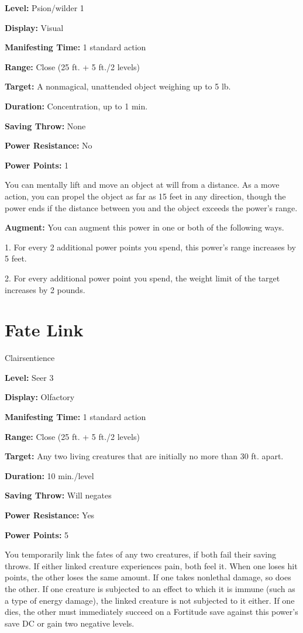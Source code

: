 \documentclass{article}
\begin{document}
\textbf{Level:} Psion/wilder 1

\textbf{Display:} Visual

\textbf{Manifesting Time:} 1 standard action

\textbf{Range:} Close (25 ft. + 5 ft./2 levels)

\textbf{Target:} A nonmagical, unattended object weighing up to 5 lb.

\textbf{Duration:} Concentration, up to 1 min.

\textbf{Saving Throw:} None

\textbf{Power Resistance:} No

\textbf{Power Points:} 1

You can mentally lift and move an object at will from a distance. As a move action, 
you can propel the object as far as 15 feet in any direction, though the power 
ends if the distance between you and the object exceeds the power's range.

\textbf{Augment:} You can augment this power in one or both of the following ways.

1. For every 2 additional power points you spend, this power's range increases 
by 5 feet.

2. For every additional power point you spend, the weight limit of the target increases 
by 2 pounds.

\vspace{12pt}
\section*{Fate Link}

Clairsentience

\textbf{Level:} Seer 3

\textbf{Display:} Olfactory

\textbf{Manifesting Time:} 1 standard action

\textbf{Range:} Close (25 ft. + 5 ft./2 levels)

\textbf{Target:} Any two living creatures that are initially no more than 30 ft. 
apart.

\textbf{Duration:} 10 min./level

\textbf{Saving Throw:} Will negates

\textbf{Power Resistance:} Yes

\textbf{Power Points:} 5

You temporarily link the fates of any two creatures, if both fail their saving 
throws. If either linked creature experiences pain, both feel it. When one loses 
hit points, the other loses the same amount. If one takes nonlethal damage, so 
does the other. If one creature is subjected to an effect to which it is immune 
(such as a type of energy damage), the linked creature is not subjected to it either. 
If one dies, the other must immediately succeed on a Fortitude save against this 
power's save DC or gain two negative levels.
\end{document}

